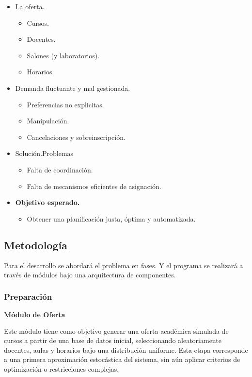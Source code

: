 \documentclass{article}
\begin{document}
\begin{itemize}
  \item La oferta.
        \begin{itemize}
          \item Cursos.
          \item Docentes.
          \item Salones (y laboratorios).
          \item Horarios.
        \end{itemize}
  \item Demanda fluctuante y mal gestionada.
        \begin{itemize}
          \item Preferencias no explicitas.
          \item Manipulación.
          \item Cancelaciones y sobreinscripción.
        \end{itemize}
  \item Solución.Problemas
        \begin{itemize}
          \item Falta de coordinación.
          \item Falta de mecanismos eficientes de asignación.
        \end{itemize}
  \item \textbf{Objetivo esperado.}
        \begin{itemize}
          \item Obtener una planificación justa, óptima y automatizada.
        \end{itemize}
\end{itemize}

\subsection{Metodología}

Para el desarrollo se abordará el problema en fases. Y el programa se realizará a través de módulos
bajo una arquitectura de componentes.

\subsubsection{Preparación}

\textbf{Módulo de Oferta}

Este módulo tiene como objetivo generar una oferta académica simulada de cursos a partir de una base 
de datos inicial, seleccionando aleatoriamente docentes, aulas y horarios bajo una distribución 
uniforme. Esta etapa corresponde a una primera aproximación estocástica del sistema, sin aún aplicar
criterios de optimización o restricciones complejas.\\
\end{document}
